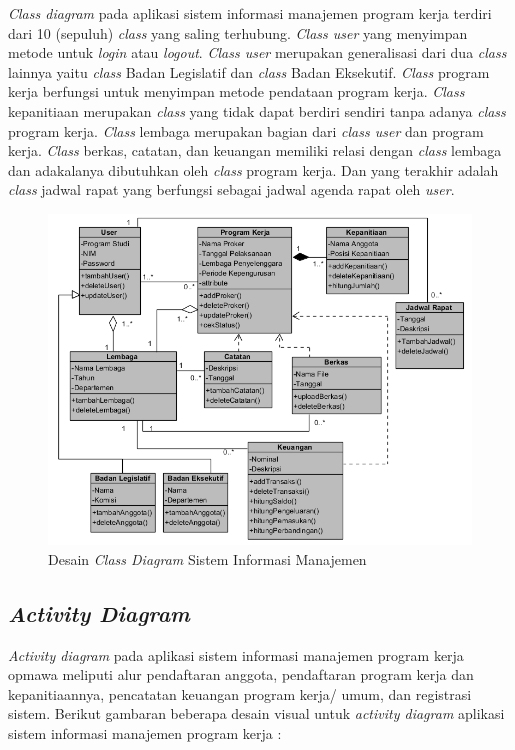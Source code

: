 \textit{Class diagram} pada aplikasi sistem informasi manajemen program kerja terdiri dari 10 (sepuluh) \textit{class} yang saling terhubung. \textit{Class user} yang menyimpan metode untuk \textit{login} atau \textit{logout}. \textit{Class user} merupakan generalisasi dari dua \textit{class} lainnya yaitu \textit{class} Badan Legislatif dan \textit{class} Badan Eksekutif. \textit{Class} program kerja berfungsi untuk menyimpan metode pendataan program kerja. \textit{Class} kepanitiaan merupakan \textit{class} yang tidak dapat berdiri sendiri tanpa adanya \textit{class} program kerja. \textit{Class} lembaga merupakan bagian dari \textit{class user} dan program kerja. \textit{Class} berkas, catatan, dan keuangan memiliki relasi dengan \textit{class} lembaga dan adakalanya dibutuhkan oleh \textit{class} program kerja. Dan yang terakhir adalah \textit{class} jadwal rapat yang berfungsi sebagai jadwal agenda rapat oleh \textit{user}.

\begin{figure}[H]
	\centering
	\includegraphics[width=1.0\textwidth]{gambar/class}
	\caption{Desain \emph{Class Diagram} Sistem Informasi Manajemen}
	\label{class_diagram}
\end{figure}


\subsection{\textit{Activity Diagram}}

\textit{Activity diagram} pada aplikasi sistem informasi manajemen program kerja opmawa meliputi alur pendaftaran anggota, pendaftaran program kerja dan kepanitiaannya, pencatatan keuangan program kerja/ umum, dan registrasi sistem. Berikut gambaran beberapa desain visual untuk \textit{activity diagram} aplikasi sistem informasi manajemen program kerja :

